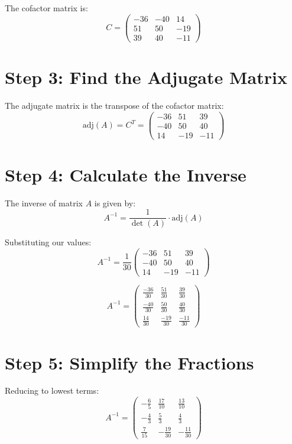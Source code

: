 \documentclass[12pt]{article}
\begin{document}
The cofactor matrix is:
\[
C = \begin{pmatrix}
-36 & -40 & 14 \\
51 & 50 & -19 \\
39 & 40 & -11
\end{pmatrix}
\]

\section{Step 3: Find the Adjugate Matrix}

The adjugate matrix is the transpose of the cofactor matrix:
\[
\text{adj}(A) = C^T = \begin{pmatrix}
-36 & 51 & 39 \\
-40 & 50 & 40 \\
14 & -19 & -11
\end{pmatrix}
\]

\section{Step 4: Calculate the Inverse}

The inverse of matrix $A$ is given by:
\[
A^{-1} = \frac{1}{\det(A)} \cdot \text{adj}(A)
\]

Substituting our values:
\[
A^{-1} = \frac{1}{30} \begin{pmatrix}
-36 & 51 & 39 \\
-40 & 50 & 40 \\
14 & -19 & -11
\end{pmatrix}
\]

\[
A^{-1} = \begin{pmatrix}
\frac{-36}{30} & \frac{51}{30} & \frac{39}{30} \\
\frac{-40}{30} & \frac{50}{30} & \frac{40}{30} \\
\frac{14}{30} & \frac{-19}{30} & \frac{-11}{30}
\end{pmatrix}
\]

\section{Step 5: Simplify the Fractions}

Reducing to lowest terms:
\[
A^{-1} = \begin{pmatrix}
-\frac{6}{5} & \frac{17}{10} & \frac{13}{10} \\
-\frac{4}{3} & \frac{5}{3} & \frac{4}{3} \\
\frac{7}{15} & -\frac{19}{30} & -\frac{11}{30}
\end{pmatrix}
\]
\end{document}
